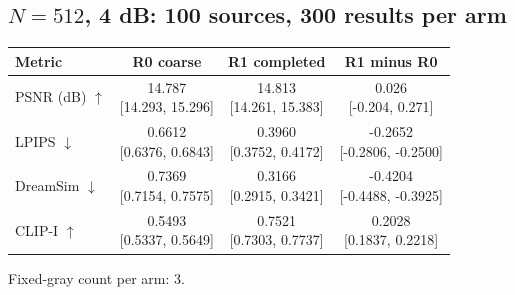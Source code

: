 \documentclass[11pt,letterpaper]{article}
\begin{document}
\subsection*{$N=512$, 4 dB: 100 sources, 300 results per arm}
\begin{center}\small\setlength{\tabcolsep}{7pt}\renewcommand{\arraystretch}{1.55}
\begin{tabular}{lccc}
\toprule
Metric & R0 coarse & R1 completed & R1 minus R0\\\midrule
PSNR (dB) $\uparrow$ & \shortstack{14.787\\{}[14.293, 15.296]} & \shortstack{14.813\\{}[14.261, 15.383]} & \shortstack{0.026\\{}[-0.204, 0.271]}\\
LPIPS $\downarrow$ & \shortstack{0.6612\\{}[0.6376, 0.6843]} & \shortstack{0.3960\\{}[0.3752, 0.4172]} & \shortstack{-0.2652\\{}[-0.2806, -0.2500]}\\
DreamSim $\downarrow$ & \shortstack{0.7369\\{}[0.7154, 0.7575]} & \shortstack{0.3166\\{}[0.2915, 0.3421]} & \shortstack{-0.4204\\{}[-0.4488, -0.3925]}\\
CLIP-I $\uparrow$ & \shortstack{0.5493\\{}[0.5337, 0.5649]} & \shortstack{0.7521\\{}[0.7303, 0.7737]} & \shortstack{0.2028\\{}[0.1837, 0.2218]}\\
\bottomrule\end{tabular}\end{center}
Fixed-gray count per arm: 3.
\end{document}
